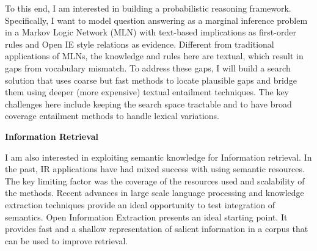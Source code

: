 \documentclass[a4paper,11pt,onecolumn]{article}
\begin{document}
To this end, I am interested in building a probabilistic reasoning framework. Specifically, I want to model question answering as a marginal inference problem in a Markov Logic Network (MLN) with text-based implications as first-order rules and Open IE style relations as evidence. Different from traditional applications of MLNs, the knowledge and rules here are textual, which result in gaps from vocabulary mismatch. To address these gaps, I will build a search solution that uses coarse but fast methods to locate plausible gaps and bridge them using deeper (more expensive) textual entailment techniques. The key challenges here include keeping the search space tractable and to have broad coverage entailment methods to handle lexical variations. 


{\bf Information Retrieval}

I am also interested in exploiting semantic knowledge for Information retrieval. In the past, IR applications have had mixed success with using semantic resources. The key limiting factor was the coverage of the resources used and scalability of the methods. Recent advances in large scale language processing and knowledge extraction techniques provide an ideal opportunity to test integration of semantics. Open Information Extraction presents an ideal starting point. It provides fast and a shallow representation of salient information in a corpus that can be used to improve retrieval. 
\end{document}

